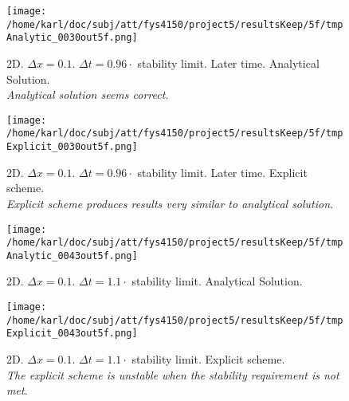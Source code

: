 \documentclass{article}
\begin{document}
\begin{minipage}{.45\textwidth} 
	\begin{figure}[H]
		\centering
		\texttt{[image: /home/karl/doc/subj/att/fys4150/project5/resultsKeep/5f/tmpAnalytic\_0030out5f.png]}
		\caption{2D. $\Delta x = 0.1$. $\Delta t = 0.96 \cdot$ stability limit. Later time. Analytical Solution.\\ \textit{Analytical solution seems correct.}}
		\label{fig:fig2d4}
	\end{figure}
\end{minipage}\hfill
\begin{minipage}{.45\textwidth} 
	\begin{figure}[H]
		\centering
		\texttt{[image: /home/karl/doc/subj/att/fys4150/project5/resultsKeep/5f/tmpExplicit\_0030out5f.png]}
		\caption{2D. $\Delta x = 0.1$. $\Delta t = 0.96 \cdot$ stability limit. Later time. Explicit scheme.\\ \textit{Explicit scheme produces results very similar to analytical solution.}}
		\label{fig:fig2d5}
	\end{figure}
\end{minipage}\hfill
\vspace{2ex}




\begin{minipage}{.45\textwidth} 
	\begin{figure}[H]
		\centering
		\texttt{[image: /home/karl/doc/subj/att/fys4150/project5/resultsKeep/5f/tmpAnalytic\_0043out5f.png]}
		\caption{2D. $\Delta x = 0.1$. $\Delta t = 1.1 \cdot$ stability limit.  Analytical Solution.\\ \textit{}}
		\label{fig:fig2d6}
	\end{figure}
\end{minipage}\hfill
\begin{minipage}{.45\textwidth} 
	\begin{figure}[H]
		\centering
		\texttt{[image: /home/karl/doc/subj/att/fys4150/project5/resultsKeep/5f/tmpExplicit\_0043out5f.png]}
		\caption{2D. $\Delta x = 0.1$. $\Delta t = 1.1 \cdot$ stability limit.  Explicit scheme.\\ \textit{The explicit scheme is unstable when the stability requirement is not met.}}
		\label{fig:fig2d7}
	\end{figure}
\end{minipage}\hfill
\vspace{2ex}
\end{document}
